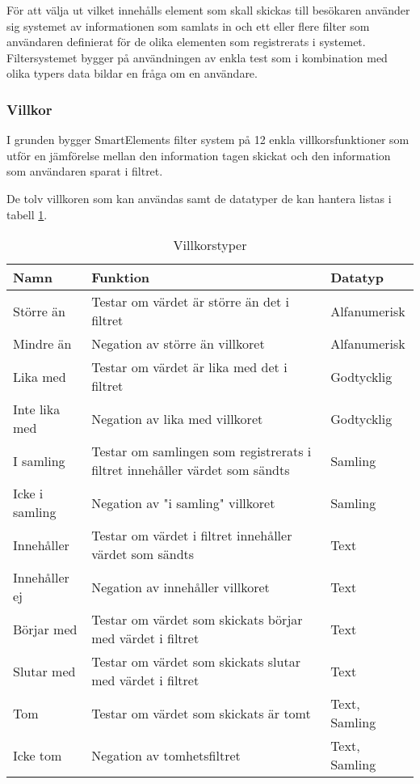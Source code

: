 För att välja ut vilket innehålls element som skall skickas till besökaren använder sig systemet av informationen som samlats in och ett eller flere filter som användaren definierat för de olika elementen som registrerats i systemet. Filtersystemet bygger på användningen av enkla test som i kombination med olika typers data bildar en fråga om en användare.

\subsubsection{Villkor}

I grunden bygger SmartElements filter system på 12 enkla villkorsfunktioner som utför en jämförelse mellan den information tagen skickat och den information som användaren sparat i filtret.

De tolv villkoren som kan användas samt de datatyper de kan hantera listas i tabell \ref{table:villkor}.

\begin{table}
    \begin{tabular}{|l|p{8cm}|l|}
    \hline
    Namn & Funktion & Datatyp \\
    \hline
    Större än & Testar om värdet är större än det i filtret & Alfanumerisk \\
    \hline
    Mindre än & Negation av större än villkoret & Alfanumerisk \\
    \hline
    Lika med & Testar om värdet är lika med det i filtret & Godtycklig \\
    \hline
    Inte lika med & Negation av lika med villkoret & Godtycklig \\
    \hline
    I samling & Testar om samlingen som registrerats i filtret innehåller värdet som sändts & Samling \\
    \hline
    Icke i samling & Negation av "i samling" villkoret & Samling \\
    \hline
    Innehåller & Testar om värdet i filtret innehåller värdet som sändts & Text \\
    \hline
    Innehåller ej & Negation av innehåller villkoret & Text \\
    \hline
    Börjar med & Testar om värdet som skickats börjar med värdet i filtret & Text \\
    \hline
    Slutar med & Testar om värdet som skickats slutar med värdet i filtret & Text \\
    \hline
    Tom & Testar om värdet som skickats är tomt & Text, Samling \\
    \hline
    Icke tom & Negation av tomhetsfiltret & Text, Samling \\
    \hline
    \end{tabular}
    \caption{Villkorstyper}
    \label{table:villkor}
\end{table}

